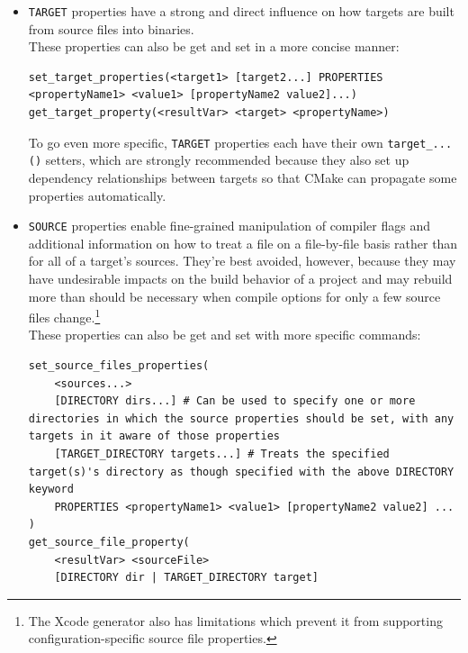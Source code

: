 \documentclass[table, xcdraw]{article}%
\begin{document}
\begin{itemize}
    \begin{verbatim}
set_directory_properties(PROPERTIES <prop1> <val1> [prop2 val2] ...)
get_directory_property(<resultVar> [DIRECTORY dirName] <property>) # Get the value of a
property from dirName (current directory by default)
get_directory_property(<resultVar> [DIRECTORY dirName] DEFINITION <varName>) # Get the value of a variable from dirName (current directory by default, but that's not very useful)
\end{verbatim}
\item \texttt{TARGET} properties have a strong and direct influence on how targets are built from source files into binaries.\\
These properties can also be get and set in a more concise manner:
\begin{verbatim}
set_target_properties(<target1> [target2...] PROPERTIES <propertyName1> <value1> [propertyName2 value2]...)
get_target_property(<resultVar> <target> <propertyName>)
\end{verbatim}
To go even more specific, \texttt{TARGET} properties each have their own \texttt{target_...()} setters, which are strongly recommended because they also set up dependency relationships between targets so that CMake can propagate some properties automatically.
\item \texttt{SOURCE} properties enable fine-grained manipulation of compiler flags and additional information on how to treat a file on a file-by-file basis rather than for all of a target’s sources. They're best avoided, however, because they may have undesirable impacts on the build behavior of a project and may rebuild more than should be necessary when compile options for only a few source files change.\footnote{The Xcode generator also has limitations which prevent it from supporting configuration-specific source file properties.}\\
These properties can also be get and set with more specific commands:
\begin{verbatim}
set_source_files_properties(
    <sources...>
    [DIRECTORY dirs...] # Can be used to specify one or more directories in which the source properties should be set, with any targets in it aware of those properties
    [TARGET_DIRECTORY targets...] # Treats the specified target(s)'s directory as though specified with the above DIRECTORY keyword
    PROPERTIES <propertyName1> <value1> [propertyName2 value2] ...
)
get_source_file_property(
    <resultVar> <sourceFile>
    [DIRECTORY dir | TARGET_DIRECTORY target]

\end{verbatim}
\end{itemize}
\end{document}
